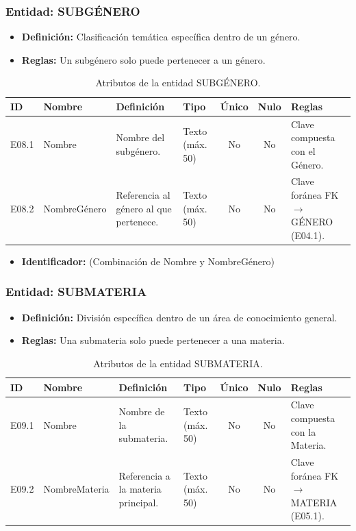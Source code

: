 \subsubsection{Entidad: SUBGÉNERO}
\begin{itemize}
	\item\textbf{Definición:} Clasificación temática específica dentro de un género.
	\item\textbf{Reglas:} Un subgénero solo puede pertenecer a un género.
\end{itemize}

\begin{table}[H]
	\centering
	\caption{Atributos de la entidad SUBGÉNERO.}
	\label{tab:dict_subgenero}
	\small
	\begin{tabularx}{\textwidth}{l l X l c c X}
		\toprule
		\textbf{ID} & \textbf{Nombre} & \textbf{Definición} & \textbf{Tipo} & \textbf{Único} & \textbf{Nulo} & \textbf{Reglas} \\
		\midrule
		E08.1 & Nombre & Nombre del subgénero. & Texto (máx. 50) & No & No & Clave compuesta con el Género. \\
		\addlinespace
		E08.2 & NombreGénero & Referencia al género al que pertenece. & Texto (máx. 50) & No & No & Clave foránea FK $\rightarrow$ GÉNERO (E04.1). \\
		\bottomrule
	\end{tabularx}
\end{table}

\begin{itemize}
	\item\textbf{Identificador:} (Combinación de Nombre y NombreGénero)
\end{itemize}

\subsubsection{Entidad: SUBMATERIA}
\begin{itemize}
	\item\textbf{Definición:} División específica dentro de un área de conocimiento general.
	\item\textbf{Reglas:} Una submateria solo puede pertenecer a una materia.
\end{itemize}

\begin{table}[H]
	\centering
	\caption{Atributos de la entidad SUBMATERIA.}
	\label{tab:dict_submateria}
	\small
	\begin{tabularx}{\textwidth}{l l X l c c X}
		\toprule
		\textbf{ID} & \textbf{Nombre} & \textbf{Definición} & \textbf{Tipo} & \textbf{Único} & \textbf{Nulo} & \textbf{Reglas} \\
		\midrule
		E09.1 & Nombre & Nombre de la submateria. & Texto (máx. 50) & No & No & Clave compuesta con la Materia. \\
		\addlinespace
		E09.2 & NombreMateria & Referencia a la materia principal. & Texto (máx. 50) & No & No & Clave foránea FK $\rightarrow$ MATERIA (E05.1). \\
		\bottomrule
	\end{tabularx}
\end{table}

